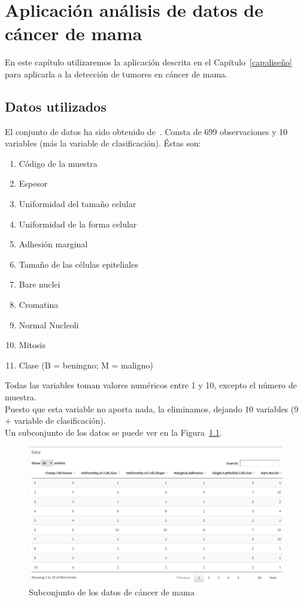 \chapter[Aplicación análisis de datos de cáncer de mama]{Aplicación análisis de datos de cáncer de mama}

En este capítulo utilizaremos la aplicación descrita en el Capítulo~\ref{cap:diseño} para aplicarla a la detección de tumores en cáncer de mama.

\section{Datos utilizados}

El conjunto de datos ha sido obtenido de~\cite{cancer}. Consta de 699 observaciones y 10 variables (más la variable de clasificación). Éstas son:

\begin{enumerate}
	\item Código de la muestra
	\item Espesor
	\item Uniformidad del tamaño celular
	\item Uniformidad de la forma celular
	\item Adhesión marginal
	\item Tamaño de las células epiteliales
	\item Bare nuclei
	\item Cromatina
	\item Normal Nucleoli
	\item Mitosis
	\item Clase (B = beningno; M = maligno)
\end{enumerate}

Todas las variables toman valores numéricos entre 1 y 10, excepto el número de muestra.\\

Puesto que esta variable no aporta nada, la eliminamos, dejando 10 variables (9 + variable de clasificación).\\

Un subconjunto de los datos se puede ver en la Figura~\ref{fig:datos_cancer}.\\

\begin{figure}[tbph!]
\centering
\includegraphics[width=0.6\linewidth]{imagenes/cancer/datos.png}
\caption{Subconjunto de los datos de cáncer de mama}
\label{fig:datos_cancer}
\end{figure}

